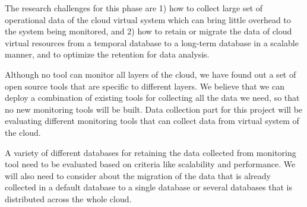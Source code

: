 The research challenges for this phase are 1) how to collect large set of operational data of the cloud virtual system which can bring little overhead to the system being monitored, and 2) how to retain or migrate the data of cloud virtual resources from a temporal database to a long-term database in a scalable manner, and to optimize the retention for data analysis.

Although no tool can monitor all layers of the cloud, we have found out a set of open source tools that are specific to different layers. We believe that we can deploy a combination of existing tools for collecting all the data we need, so that no new monitoring tools will be built. Data collection part for this project will be evaluating different monitoring tools that can collect data from virtual system of the cloud. 

A variety of different databases  for retaining the data collected from monitoring tool need to be evaluated based on criteria like scalability and performance. We will also need to consider about the migration of the data that is already collected in a default database to a single database or several databases that is distributed across the whole cloud.


%




